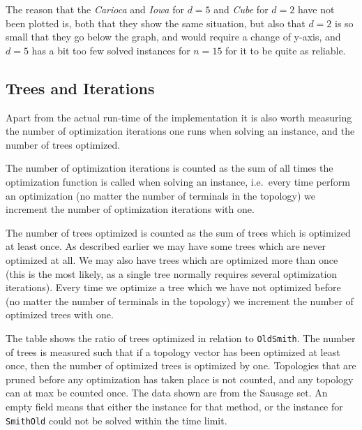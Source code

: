 The reason that the \textit{Carioca} and \textit{Iowa} for $d=5$ and
\textit{Cube} for $d = 2$ have not been plotted is, both that they show the same
situation, but also that $d=2$ is so small that they go below the graph, and
would require a change of y-axis, and $d=5$ has a bit too few solved
instances for $n=15$ for it to be quite as reliable.

\subsection{Trees and Iterations}
\label{sec:trees-iterations}

Apart from the actual run-time of the implementation it is also worth measuring
the number of optimization iterations one runs when solving an instance, and the
number of trees optimized.

The number of optimization iterations is counted as the sum of all times the
optimization function is called when solving an instance, i.e.\ every time
perform an optimization (no matter the number of terminals in the topology) we
increment the number of optimization iterations with one.

The number of trees optimized is counted as the sum of trees which is optimized
at least once. As described earlier we may have some trees which are never
optimized at all. We may also have trees which are optimized more than once
(this is the most likely, as a single tree normally requires several
optimization iterations). Every time we optimize a tree which we have not
optimized before (no matter the number of terminals in the topology) we
increment the number of optimized trees with one.

\begin{table}[htbp]
  \centering
  
  \caption[Tree-exploration ratio for Sausage]{The table shows the ratio of
    trees optimized in relation to \texttt{OldSmith}. The number of trees is
    measured such that if a topology vector has been optimized at least once,
    then the number of optimized trees is optimized by one. Topologies that are
    pruned before any optimization has taken place is not counted, and any
    topology can at max be counted once. The data shown are from the Sausage
    set. An empty field means that either the instance for that method, or the
    instance for \texttt{SmithOld} could not be solved within the time
    limit.\label{tab:trees-sausage-ratio}}
\end{table}


